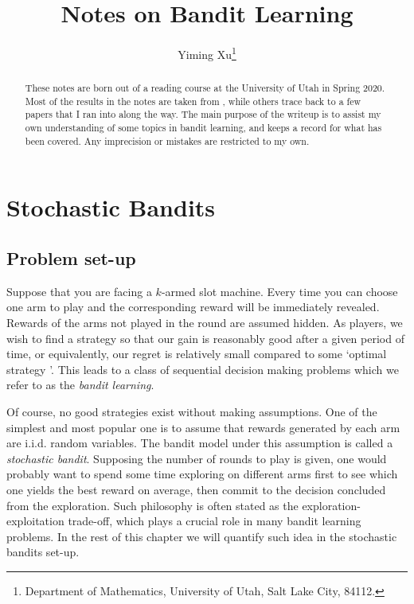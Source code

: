 \documentclass[10pt,a4article]{article}
\numberwithin{equation}{section}
\theoremstyle{plain}
\theoremstyle{definition}
\begin{document}
\title{Notes on Bandit Learning}
\date{}
\author{Yiming Xu\thanks{Department of Mathematics, University of Utah, Salt Lake City, 84112. }}
\maketitle

\begin{abstract}
These notes are born out of a reading course at the University of Utah in Spring 2020. Most of the results in the notes are taken from \cite{lattimore2018bandit}, while others trace back to a few papers that I ran into along the way. The main purpose of the writeup is to assist my own understanding of some topics in bandit learning, and keeps a record for what has been covered. Any imprecision or mistakes are restricted to my own. 
\end{abstract}

\bigskip

\bigskip

\bigskip

\tableofcontents
\newpage

\section{Stochastic Bandits}\label{sec1}

\subsection{Problem set-up}\label{bg}

Suppose that you are facing a $k$-armed slot machine. Every time you can choose one arm to play and the corresponding reward will be immediately revealed. Rewards of the arms not played in the round are assumed hidden. As players, we wish to find a strategy so that our gain is reasonably good after a given period of time, or equivalently, our regret is relatively small compared to some `optimal strategy '. This leads to a class of sequential decision making problems which we refer to as the \emph{bandit learning}.  

Of course, no good strategies exist without making assumptions. One of the simplest and most popular one is to assume that rewards generated by each arm are i.i.d. random variables. The bandit model under this assumption is called a \emph{stochastic bandit}. Supposing the number of rounds to play is given, one would probably want to spend some time exploring on different arms first to see which one yields the best reward on average, then commit to the decision concluded from the exploration. Such philosophy is often stated as the exploration-exploitation trade-off, which plays a crucial role in many bandit learning problems. In the rest of this chapter we will quantify such idea in the stochastic bandits set-up. 
\end{document}
